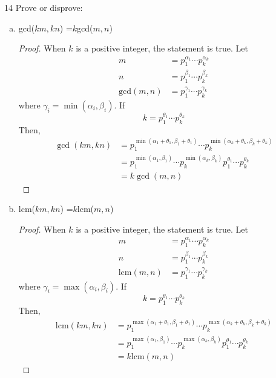 \documentclass[a4paper,12pt]{article}
\theoremstyle{definition}
\newenvironment{problems}{\begin{list}{}{\renewcommand{\makelabel}[1]{\textbf{##1}\hfil}}}{\end{list}}
\begin{document}
\begin{problems}
    \item[14] Prove or disprove:
    \begin{enumerate}[a.]
        \item gcd($km, kn$) =$k$gcd($m, n$)
        \begin{proof}
            When $k$ is a positive integer, the statement is true. Let
            \begin{align*}
                m &= p_1^{\alpha_1}\cdots p_k^{\alpha_k}\\
                n &= p_1^{\beta_1}\cdots p_k^{\beta_k}\\
                \text{gcd}(m,n) &= p_1^{\gamma_1}\cdots p_k^{\gamma_k}
            \end{align*} 
            where $\gamma_i = \min(\alpha_i,\beta_i)$. If
            \begin{equation*}
                k = p_1^{\theta_1}\cdots p_k^{\theta_k}
            \end{equation*}
            Then,
            \begin{align*}
                \gcd(km,kn) &= p_1^{\min(\alpha_1+\theta_1,\beta_1+\theta_1)}\cdots p_k^{\min(\alpha_k+\theta_k,\beta_k+\theta_k)}\\
                &= p_1^{\min(\alpha_1,\beta_1)}\cdots p_k^{\min(\alpha_k,\beta_k)}p_1^{\theta_1}\cdots p_k^{\theta_k}\\
                &= k\gcd(m,n)
            \end{align*}
        \end{proof}
        \item lcm($km, kn$) =$k$lcm($m, n$)
        \begin{proof}
            When $k$ is a positive integer, the statement is true. Let
            \begin{align*}
                m &= p_1^{\alpha_1}\cdots p_k^{\alpha_k}\\
                n &= p_1^{\beta_1}\cdots p_k^{\beta_k}\\
                \text{lcm}(m,n) &= p_1^{\gamma_1}\cdots p_k^{\gamma_k}
            \end{align*} 
            where $\gamma_i = \max(\alpha_i,\beta_i)$. If
            \begin{equation*}
                k = p_1^{\theta_1}\cdots p_k^{\theta_k}
            \end{equation*}
            Then,
            \begin{align*}
                \text{lcm}(km,kn) &= p_1^{\max(\alpha_1+\theta_1,\beta_1+\theta_1)}\cdots p_k^{\max(\alpha_k+\theta_k,\beta_k+\theta_k)}\\
                &= p_1^{\max(\alpha_1,\beta_1)}\cdots p_k^{\max(\alpha_k,\beta_k)}p_1^{\theta_1}\cdots p_k^{\theta_k}\\
                &= k\text{lcm}(m,n)
            \end{align*}
        \end{proof}
    \end{enumerate}


\end{problems}
\end{document}
